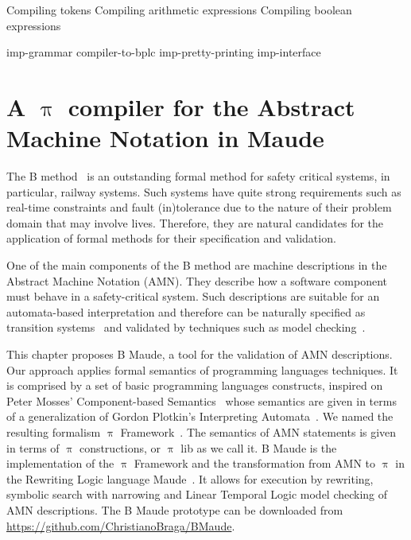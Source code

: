 \documentclass[a4paper,openany]{book}
\begin{document}
\nwenddocs{}\endmoddef\nwstartdeflinemarkup\nwenddeflinemarkup
 \LA{}Compiling tokens\RA{}
 \LA{}Compiling arithmetic expressions\RA{}
 \LA{}Compiling boolean expressions\RA{}
\nwendcode{}\nwdocspar

\nwenddocs{}\endmoddef\nwstartdeflinemarkup\nwenddeflinemarkup
\LA{}imp-grammar\RA{}
\LA{}compiler-to-bplc\RA{}
\LA{}imp-pretty-printing\RA{}
\LA{}imp-interface\RA{}
\nwendcode{}\nwdocspar
\nwenddocs{}


\chapter{A $\uppi$ compiler for the Abstract Machine Notation in Maude}\label{sec:amn}


The B method~\cite{b-book} is an outstanding formal method for safety critical systems, in particular, railway systems. Such systems have quite strong requirements such as real-time constraints and fault (in)tolerance due to the nature of their problem domain that may involve lives. Therefore, they are natural candidates for the application of formal methods for their specification and validation.       

One of the main components of the B method are machine descriptions in the Abstract Machine Notation (AMN). They describe how a software component must behave in a safety-critical system.
Such descriptions are suitable for an automata-based interpretation and therefore can be naturally specified as transition systems~\cite{Clarke:2000:MC:332656} and validated by techniques such as model checking~\cite{Clarke:2000:MC:332656}.

This chapter proposes B Maude, a tool for the validation of AMN descriptions. Our approach applies formal semantics of programming languages techniques. It is comprised by a set of basic programming languages constructs, inspired on Peter Mosses' Component-based Semantics~\cite{Mosses:2009:CS:1596486.1596489} whose semantics are given in terms of a generalization of Gordon Plotkin's Interpreting Automata~\cite{plotkin}. We named the resulting formalism $\uppi$ Framework~\cite{2018arXiv180504650B}. The semantics of AMN statements is given in terms of $\uppi$ constructions, or $\uppi$ lib as we call it. B Maude is the implementation of the $\uppi$ Framework and the transformation from AMN to $\uppi$ in the Rewriting Logic language Maude~\cite{maude/2007}. It allows for execution by rewriting, symbolic search with narrowing and Linear Temporal Logic model checking of AMN descriptions. The B Maude prototype can be downloaded from \url{https://github.com/ChristianoBraga/BMaude}. 
\end{document}
